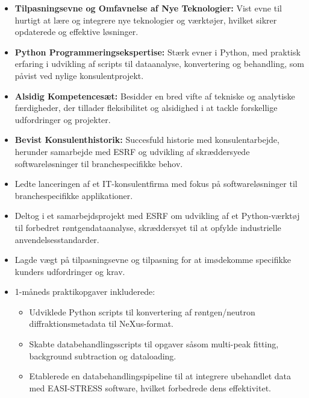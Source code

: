 \documentclass[10pt,a4paper,ragged2e,withhyper]{altacv}
\begin{document}
\begin{paracol}{2}
\begin{itemize}
    \item \textbf{Tilpasningsevne og Omfavnelse af Nye Teknologier:} Vist evne til hurtigt at lære og integrere nye teknologier og værktøjer, hvilket sikrer opdaterede og effektive løsninger.
    \item \textbf{Python Programmeringsekspertise:} Stærk evner i Python, med praktisk erfaring i udvikling af scripts til dataanalyse, konvertering og behandling, som påvist ved nylige konsulentprojekt.
    \item \textbf{Alsidig Kompetencesæt:} Besidder en bred vifte af tekniske og analytiske færdigheder, der tillader fleksibilitet og alsidighed i at tackle forskellige udfordringer og projekter.
    \item \textbf{Bevist Konsulenthistorik:} Succesfuld historie med konsulentarbejde, herunder samarbejde med ESRF og udvikling af skræddersyede softwareløsninger til branchespecifikke behov.
\end{itemize}

\begin{multicols}{2}
    \begin{itemize}
        \item Ledte lanceringen af et IT-konsulentfirma med fokus på softwareløsninger til branchespecifikke applikationer.
        \item Deltog i et samarbejdsprojekt med ESRF om udvikling af et Python-værktøj til forbedret røntgendataanalyse, skræddersyet til at opfylde industrielle anvendelsesstandarder.
        \item Lagde vægt på tilpasningsevne og tilpasning for at imødekomme specifikke kunders udfordringer og krav.
    \end{itemize}
\end{multicols}

\divider

\begin{multicols}{2}
\begin{itemize}
    \item 1-måneds praktikopgaver inkluderede:
        \begin{itemize}
            \item Udviklede Python scripts til konvertering af røntgen/neutron diffraktionsmetadata til NeXus-format.
            \item Skabte databehandlingsscripts til opgaver såsom multi-peak fitting, background subtraction og dataloading.
            \item Etablerede en databehandlingspipeline til at integrere ubehandlet data med EASI-STRESS software, hvilket forbedrede dens effektivitet.
        \end{itemize}
\end{itemize}
\end{multicols}


\end{paracol}
\end{document}
